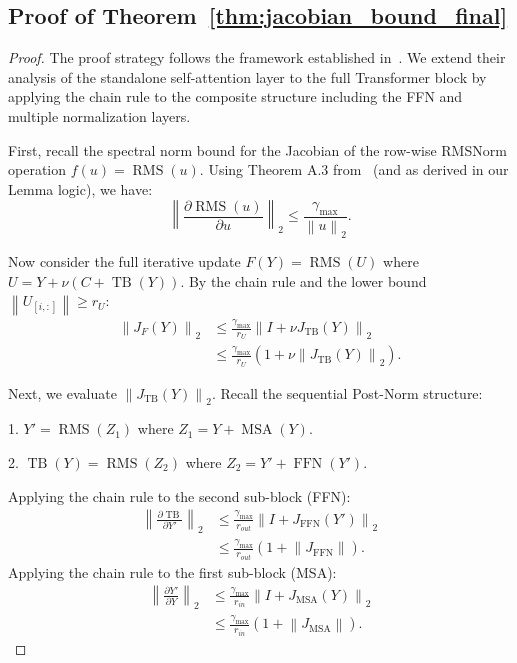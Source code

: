 \documentclass{zapiski}
\theoremstyle{plain}
\theoremstyle{definition}
\theoremstyle{remark}
\newcommand{\norm}[1]{\left\lVert #1 \right\rVert}
\DeclareMathOperator{\RMS}{RMS}
\DeclareMathOperator{\FFN}{FFN}
\DeclareMathOperator{\MSA}{MSA}
\DeclareMathOperator{\TB}{TB}
\begin{document}
\subsection{Proof of Theorem~\ref{thm:jacobian_bound_final}}
\label{app:jacobian-proof}
\begin{proof}

The proof strategy follows the framework established in~\cite{tomihari2025recurrentselfattentiondynamicsenergyagnostic}. We extend their analysis of the standalone self-attention layer to the full Transformer block by applying the chain rule to the composite structure including the FFN and multiple normalization layers.

First, recall the spectral norm bound for the Jacobian of the row-wise RMSNorm operation $f(u) = \RMS(u)$. Using Theorem A.3 from~\cite{tomihari2025recurrentselfattentiondynamicsenergyagnostic} (and as derived in our Lemma logic), we have:
\begin{equation}
    \norm{\frac{\partial \RMS(u)}{\partial u}}_2 \le \frac{\gamma_{\max}}{\norm{u}_2}.
\end{equation}

Now consider the full iterative update $F(Y)=\RMS(U)$ where $U = Y + \nu(C + \TB(Y))$.  
By the chain rule and the lower bound $\norm{U_{[i,:]}} \ge r_U$:
\begin{align}
    \norm{J_F(Y)}_2 
    &\le \frac{\gamma_{\max}}{r_U} \norm{I + \nu J_{\TB}(Y)}_2 \\
    &\le \frac{\gamma_{\max}}{r_U} (1 + \nu \norm{J_{\TB}(Y)}_2).
\end{align}

Next, we evaluate $\norm{J_{\TB}(Y)}_2$. Recall the sequential Post-Norm structure:

1. $Y' = \RMS(Z_1)$ where $Z_1 = Y + \MSA(Y)$.
    
2. $\TB(Y) = \RMS(Z_2)$ where $Z_2 = Y' + \FFN(Y')$.

Applying the chain rule to the second sub-block (FFN):
\begin{align}
    \norm{\frac{\partial \TB}{\partial Y'}}_2 
    &\le \frac{\gamma_{\max}}{r_{out}} \norm{I + J_{\FFN}(Y')}_2 \\
    &\le \frac{\gamma_{\max}}{r_{out}} (1 + \norm{J_{\FFN}}).
\end{align}
Applying the chain rule to the first sub-block (MSA):
\begin{align}
    \norm{\frac{\partial Y'}{\partial Y}}_2 
    &\le \frac{\gamma_{\max}}{r_{in}} \norm{I + J_{\MSA}(Y)}_2 \\
    &\le \frac{\gamma_{\max}}{r_{in}} (1 + \norm{J_{\MSA}}).
\end{align}


\end{proof}
\end{document}
